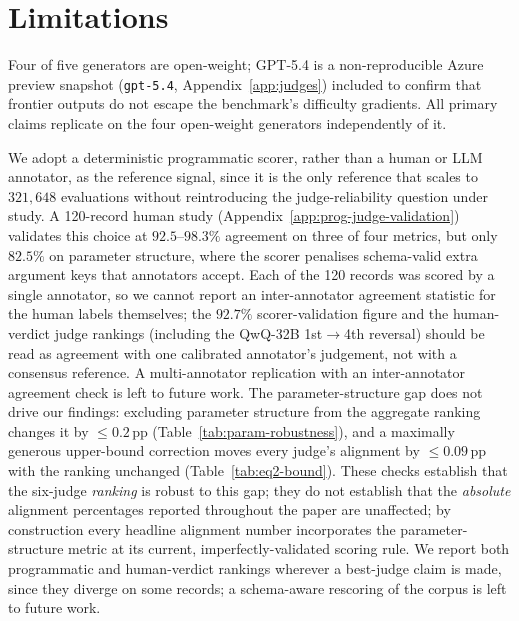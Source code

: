 \section*{Limitations}
\label{app:limitations}

Four of five generators are open-weight; GPT-5.4 is a non-reproducible Azure preview snapshot (\texttt{gpt-5.4}, Appendix~\ref{app:judges}) included to confirm that frontier outputs do not escape the benchmark's difficulty gradients. All primary claims replicate on the four open-weight generators independently of it.

We adopt a deterministic programmatic scorer, rather than a human or LLM annotator, as the reference signal, since it is the only reference that scales to $321{,}648$ evaluations without reintroducing the judge-reliability question under study. A 120-record human study (Appendix~\ref{app:prog-judge-validation}) validates this choice at $92.5$--$98.3\%$ agreement on three of four metrics, but only $82.5\%$ on parameter structure, where the scorer penalises schema-valid extra argument keys that annotators accept. Each of the 120 records was scored by a single annotator, so we cannot report an inter-annotator agreement statistic for the human labels themselves; the $92.7\%$ scorer-validation figure and the human-verdict judge rankings (including the QwQ-32B 1st$\to$4th reversal) should be read as agreement with one calibrated annotator's judgement, not with a consensus reference. A multi-annotator replication with an inter-annotator agreement check is left to future work. The parameter-structure gap does not drive our findings: excluding parameter structure from the aggregate ranking changes it by $\leq0.2$\,pp (Table~\ref{tab:param-robustness}), and a maximally generous upper-bound correction moves every judge's alignment by $\leq0.09$\,pp with the ranking unchanged (Table~\ref{tab:eq2-bound}). These checks establish that the six-judge \emph{ranking} is robust to this gap; they do not establish that the \emph{absolute} alignment percentages reported throughout the paper are unaffected; by construction every headline alignment number incorporates the parameter-structure metric at its current, imperfectly-validated scoring rule. We report both programmatic and human-verdict rankings wherever a best-judge claim is made, since they diverge on some records; a schema-aware rescoring of the corpus is left to future work.

